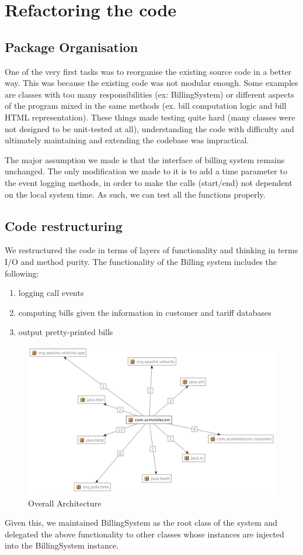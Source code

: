 \documentclass[11pt,twocolumn]{article} %
\begin{document}
\section{Refactoring the code}

\subsection{Package Organisation}
One of the very first tasks was to reorganise the existing source code in a better way.
This was because the existing code was not modular enough. Some examples are classes with too many responsibilities (ex: BillingSystem) 
or different aspects of the program mixed in the same methods (ex. bill computation logic and bill HTML representation).
These things made testing quite hard (many classes were not designed to be unit-tested at all), understanding the code with difficulty 
and ultimately maintaining and extending the codebase was impractical.

The major assumption we made is that the interface of billing system remains unchanged. The only modification we made to it is to add 
a time parameter to the event logging methods, in order to make the calls (start/end) not dependent on the local system time. As such, 
we can test all the functions properly.

\subsection{Code restructuring}
We restructured the code in terms of layers of functionality and thinking in terms I/O and method purity.
The functionality of the Billing system includes the following:
\begin{enumerate}
 \item{logging call events}
 \item{computing bills given the information in customer and tariff databases}
 \item{output pretty-printed bills}
\end{enumerate}
\begin{figure}[!ht]
\includegraphics[scale=0.30]{overall_architecture.png}
\caption{Overall Architecture}
\end{figure}
Given this, we maintained BillingSystem as the root class of the system and delegated the above functionality to other classes whose
instances are injected into the BillingSystem instance.
\end{document}
